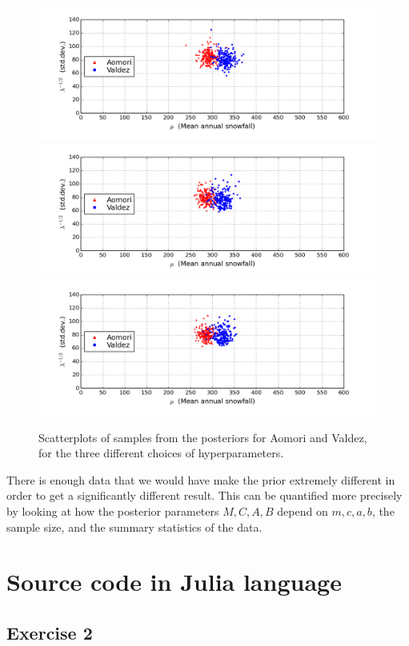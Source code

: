 \documentclass[12pt]{article}
\begin{document}
\begin{figure}
  \begin{center}
    \includegraphics[width=1\textwidth]{code/snow-posteriors-2.png}
    \includegraphics[width=1\textwidth]{code/snow-posteriors-3.png}
    \includegraphics[width=1\textwidth]{code/snow-posteriors-4.png}
  \end{center}
  \caption{Scatterplots of samples from the posteriors for Aomori and Valdez, for the three different choices of hyperparameters.}
  \label{figure:snow-posteriors-alt}
\end{figure}

There is enough data that we would have make the prior extremely different in order to get a significantly different result.
This can be quantified more precisely by looking at how the posterior parameters $M, C, A, B$ depend on $m,c,a,b$, the sample size, and the summary statistics of the data.


\newpage
\appendix
\section{Source code in Julia language}

\subsection*{Exercise 2}

\end{document}
